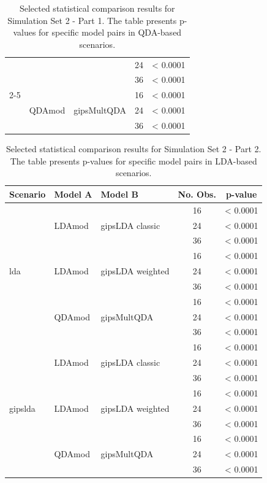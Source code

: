 \documentclass[a4paper,11pt,twoside]{report}
\theoremstyle{definition}
\begin{document}
\begin{table}[H]
\begin{tabular}{lllc c}
      & & & 24 & < 0.0001 \\
      & & & 36 & < 0.0001 \\
      \cmidrule{2-5}
      & \multirow{3}{*}{QDAmod} & \multirow{3}{*}{gipsMultQDA} & 16 & < 0.0001 \\
      & & & 24 & < 0.0001 \\
      & & & 36 & < 0.0001 \\
    \bottomrule
    \end{tabular}
    \caption{Selected statistical comparison results for Simulation Set 2 - Part 1. The table presents p-values for specific model pairs in QDA-based scenarios.}
    \label{tab:stat_sim_2_part1}
\end{table}

\begin{table}[H]
    \centering
    \setlength{\tabcolsep}{4pt}
    \small
    \begin{tabular}{lllc c}
    \toprule
    \textbf{Scenario} & \textbf{Model A} & \textbf{Model B} & \textbf{No. Obs.} & \textbf{p-value} \\
    \midrule
    \multirow{9}{*}{lda}
      & \multirow{3}{*}{LDAmod} & \multirow{3}{*}{gipsLDA classic} & 16 & < 0.0001 \\
      & & & 24 & < 0.0001 \\
      & & & 36 & < 0.0001 \\
      \cmidrule{2-5}
      & \multirow{3}{*}{LDAmod} & \multirow{3}{*}{gipsLDA weighted} & 16 & < 0.0001 \\
      & & & 24 & < 0.0001 \\
      & & & 36 & < 0.0001 \\
      \cmidrule{2-5}
      & \multirow{3}{*}{QDAmod} & \multirow{3}{*}{gipsMultQDA} & 16 & < 0.0001 \\
      & & & 24 & < 0.0001 \\
      & & & 36 & < 0.0001 \\
    \midrule
    \multirow{9}{*}{gipslda}
      & \multirow{3}{*}{LDAmod} & \multirow{3}{*}{gipsLDA classic} & 16 & < 0.0001 \\
      & & & 24 & < 0.0001 \\
      & & & 36 & < 0.0001 \\
      \cmidrule{2-5}
      & \multirow{3}{*}{LDAmod} & \multirow{3}{*}{gipsLDA weighted} & 16 & < 0.0001 \\
      & & & 24 & < 0.0001 \\
      & & & 36 & < 0.0001 \\
      \cmidrule{2-5}
      & \multirow{3}{*}{QDAmod} & \multirow{3}{*}{gipsMultQDA} & 16 & < 0.0001 \\
      & & & 24 & < 0.0001 \\
      & & & 36 & < 0.0001 \\
    \bottomrule
    \end{tabular}
    \caption{Selected statistical comparison results for Simulation Set 2 - Part 2. The table presents p-values for specific model pairs in LDA-based scenarios.}
    \label{tab:stat_sim_2_part2}
\end{table}
\end{document}
